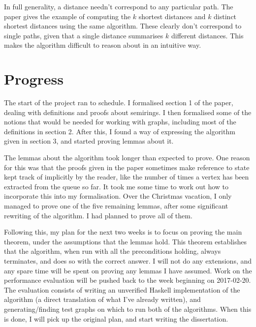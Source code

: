 \documentclass{article}
\begin{document}
In full generality, a distance needn't correspond to any particular path.
The paper gives the example of computing the $k$ shortest distances and $k$ distinct shortest distances using the same algorithm.
These clearly don't correspond to single paths, given that a single distance summarises $k$ different distances.
This makes the algorithm difficult to reason about in an intuitive way.

\section{Progress}
The start of the project ran to schedule.
I formalised section 1 of the paper, dealing with definitions and proofs about semirings.
I then formalised some of the notions that would be needed for working with graphs, including most of the definitions in section 2.
After this, I found a way of expressing the algorithm given in section 3, and started proving lemmas about it.

The lemmas about the algorithm took longer than expected to prove.
One reason for this was that the proofs given in the paper sometimes make reference to state kept track of implicitly by the reader, like the number of times a vertex has been extracted from the queue so far.
It took me some time to work out how to incorporate this into my formalisation.
Over the Christmas vacation, I only managed to prove one of the five remaining lemmas, after some significant rewriting of the algorithm.
I had planned to prove all of them.

Following this, my plan for the next two weeks is to focus on proving the main theorem, under the assumptions that the lemmas hold.
This theorem establishes that the algorithm, when run with all the preconditions holding, always terminates, and does so with the correct answer.
I will not do any extensions, and any spare time will be spent on proving any lemmas I have assumed.
Work on the performance evaluation will be pushed back to the week beginning on 2017-02-20.
The evaluation consists of writing an unverified Haskell implementation of the algorithm (a direct translation of what I've already written), and generating/finding test graphs on which to run both of the algorithms.
When this is done, I will pick up the original plan, and start writing the dissertation.



\end{document}
